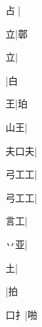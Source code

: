 \begin{multicols}{2}
{{\cjk{}{\cnsym{}　}占{\cnxb{}𠂭}}|{}\par
{\cjk{}{\cnsym{}　}{\cnsym{}　}立}|{\cjk{}鄣}\par
{立}|{}\par
\null\par
{\cjk{}{\cnsym{}　}{\cnsym{}　}{\cnsym{}　}}\mktsJzrVerticalBar{}{\cjk{}{\cnsym{}　}{\cnsym{}　}{\cnsym{}　}}|{\cjk{}白}\par
{\cjk{}{\cnsym{}　}{\cnsym{}　}王}\mktsJzrVerticalBar{}{\cjk{}{\cnsym{}　}{\cnsym{}　}{\cnsym{}　}}|{\cjk{}珀}\par
{\cjk{}{\cnsym{}　}山王}\mktsJzrVerticalBar{}{\cjk{}{\cnsym{}　}{\cnsym{}　}{\cnsym{}　}}|{}\par
{\cjk{}夫口夫}\mktsJzrVerticalBar{}{\cjk{}{\cnsym{}　}{\cnsym{}　}{\cnsym{}　}}|{}\par
{\cjk{}弓工工}\mktsJzrVerticalBar{}{\cjk{}{\cnsym{}　}{\cnsym{}　}{\cnsym{}　}}|{}\par
{\cjk{}弓工工}|{}\par
{\cjk{}{\cnsym{}　}言工}\mktsJzrVerticalBar{}{\cjk{}{\cnsym{}　}{\cnsym{}　}{\cnsym{}　}}|{}\par
{\cjk{}{\cnsym{}　}丷亚}\mktsJzrVerticalBar{}{\cjk{}{\cnsym{}　}{\cnsym{}　}{\cnsym{}　}}|{}\par
{\cjk{}{\cnsym{}　}{\cnsym{}　}土}\mktsJzrVerticalBar{}{\cjk{}{\cnsym{}　}{\cnsym{}　}{\cnsym{}　}}|{}\par
{}\mktsJzrVerticalBar{}{\cjk{}{\cnsym{}　}{\cnsym{}　}{\cnsym{}　}}|{\cjk{}拍}\par
{\cjk{}{\cnsym{}　}口{扌}}\mktsJzrVerticalBar{}{\cjk{}{\cnsym{}　}{\cnsym{}　}{\cnsym{}　}}|{\cjk{}啪}\par
}
\end{multicols}
